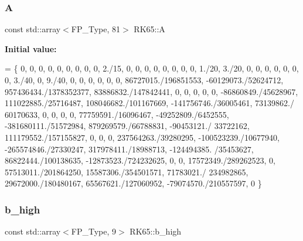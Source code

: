 \subsubsection{\texorpdfstring{A}{A}}
{\footnotesize\ttfamily const std\+::array$<$F\+P\+\_\+\+Type, 81$>$ R\+K65\+::A}

{\bfseries Initial value\+:}
\begin{DoxyCode}
= \{
    0,                    0,                     0,                      0,                     0,         
                  0,                     0,                    0,                    0,
    2./15,                0,                     0,                      0,                     0,         
                  0,                     0,                    0,                    0,
    1./20,                3./20,                 0,                      0,                     0,         
                  0,                     0,                    0,                    0,
    3./40,                0,                     9./40,                  0,                     0,         
                  0,                     0,                    0,                    0,
    86727015./196851553,  -60129073./52624712,   957436434./1378352377,  83886832./147842441,   0,         
                  0,                     0,                    0,                    0,
    -86860849./45628967,  111022885./25716487,   108046682./101167669,   -141756746./36005461,  73139862./
      60170633,    0,                     0,                    0,                    0,
    77759591./16096467,   -49252809./6452555,    -381680111./51572984,   879269579./66788831,   -90453121./
      33722162,   111179552./157155827,  0,                    0,                    0,
    237564263./39280295,  -100523239./10677940,  -265574846./27330247,   317978411./18988713,   -124494385.
      /35453627,  86822444./100138635,   -12873523./724232625, 0,                    0,
    17572349./289262523,  0,                     57513011./201864250,    15587306./354501571,   71783021./
      234982865,   29672000./180480167,   65567621./127060952,  -79074570./210557597, 0
  \}
\end{DoxyCode}
\mbox{\label{structRK65_ad2ad1106e34134960474dece17f6d254}} 
\subsubsection{\texorpdfstring{b\+\_\+high}{b\_high}}
{\footnotesize\ttfamily const std\+::array$<$F\+P\+\_\+\+Type, 9$>$ R\+K65\+::b\+\_\+high}

